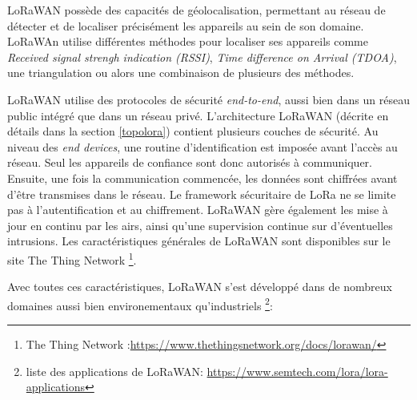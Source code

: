 \vspace{0.1cm}

LoRaWAN possède des capacités de géolocalisation, permettant au réseau de détecter et de localiser précisément les appareils au sein de son domaine. LoRaWAn utilise différentes méthodes pour localiser ses appareils comme \textit{Received signal strengh indication (RSSI)}, \textit{Time difference on Arrival (TDOA)}, une triangulation ou alors une combinaison de plusieurs des méthodes.

\vspace{0.1cm}

LoRaWAN utilise des protocoles de sécurité \textit{end-to-end}, aussi bien dans un réseau public intégré que dans un réseau privé. L'architecture LoRaWAN (décrite en détails dans la section \ref{topolora}) contient plusieurs couches de sécurité. Au niveau des \textit{end devices}, une routine d'identification est imposée avant l'accès au réseau. Seul les appareils de confiance sont donc autorisés à communiquer. Ensuite, une fois la communication commencée, les données sont chiffrées avant d'être transmises dans le réseau. Le framework sécuritaire de LoRa ne se limite pas à l'autentification et au chiffrement. LoRaWAN gère également les mise à jour en continu par les airs, ainsi qu'une supervision continue sur d'éventuelles intrusions. Les caractéristiques générales de LoRaWAN sont disponibles sur le site The Thing Network \footnote{The Thing Network :\href{https://www.thethingsnetwork.org/docs/lorawan/}{https://www.thethingsnetwork.org/docs/lorawan/}}.

\vspace{0.1cm}

Avec toutes ces caractéristiques, LoRaWAN s'est développé dans de nombreux domaines aussi bien environementaux qu'industriels \footnote{liste des applications de LoRaWAN: \href{https://www.semtech.com/lora/lora-applications}{https://www.semtech.com/lora/lora-applications}}:

\vspace{0.1cm}

